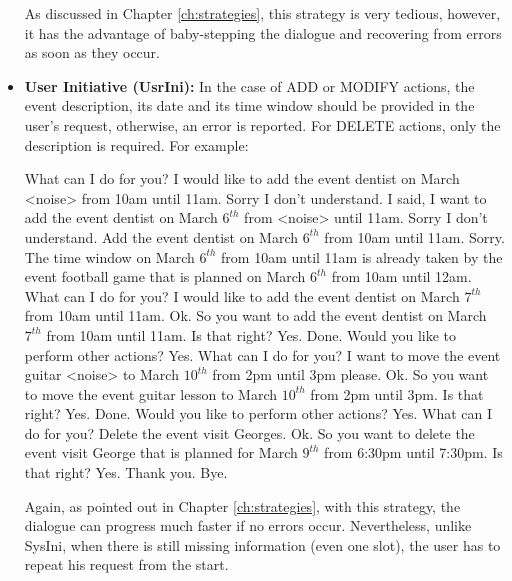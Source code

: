 \begin{itemize}
              As discussed in Chapter \ref{ch:strategies}, this strategy is very tedious, however, it has the advantage of baby-stepping the dialogue and recovering from errors as soon as they occur.

          \item \textbf{User Initiative (UsrIni):} In the case of ADD or MODIFY actions, the event description, its date and its time window should be provided in the user's request, otherwise, an error is reported. For DELETE actions, only the description is required. For example:

						\begin{dialogue}
								 What can I do for you?
								 I would like to add the event dentist on March <noise> from 10am until 11am.
								 Sorry I don't understand.
								 I said, I want to add the event dentist on March $6^{th}$ from <noise> until 11am.
								 Sorry I don't understand.
								 Add the event dentist on March $6^{th}$ from 10am until 11am.
								 Sorry. The time window on March $6^{th}$ from 10am until 11am is already taken by the event football game that is planned on March $6^{th}$ from 10am until 12am. What can I do for you?
								 I would like to add the event dentist on March $7^{th}$ from 10am until 11am.
								 Ok. So you want to add the event dentist on March $7^{th}$ from 10am until 11am. Is that right?
								 Yes.
								 Done. Would you like to perform other actions?
								 Yes.
								 What can I do for you?
								 I want to move the event guitar <noise> to March $10^{th}$ from 2pm until 3pm please.
								 Ok. So you want to move the event guitar lesson to March $10^{th}$ from 2pm until 3pm. Is that right?
								 Yes.
								 Done. Would you like to perform other actions?
								 Yes.
								 What can I do for you?
								 Delete the event visit Georges.
								 Ok. So you want to delete the event visit George that is planned for March $9^{th}$ from 6:30pm until 7:30pm. Is that right?
								 Yes.
								 Thank you. Bye.
						\end{dialogue}

              Again, as pointed out in Chapter \ref{ch:strategies}, with this strategy, the dialogue can progress much faster if no errors occur. Nevertheless, unlike SysIni, when there is still missing information (even one slot), the user has to repeat his request from the start.


\end{itemize}

